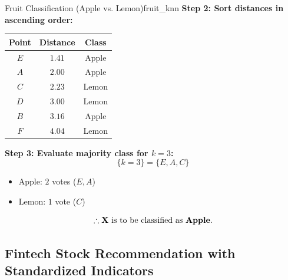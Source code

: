 \begin{example}{Fruit Classification (Apple vs. Lemon)}{fruit_knn}
\noindent\textbf{Step 2: Sort distances in ascending order:}
\begin{center}
\begin{tabular}{ccc}
\toprule
\textbf{Point} & \textbf{Distance} & \textbf{Class} \\
\midrule
$E$ & $1.41$ & Apple \\
$A$ & $2.00$ & Apple \\
$C$ & $2.23$ & Lemon \\
$D$ & $3.00$ & Lemon \\
$B$ & $3.16$ & Apple \\
$F$ & $4.04$ & Lemon \\
\bottomrule
\end{tabular}
\end{center}

\noindent\textbf{Step 3: Evaluate majority class for $k = 3$:}
$$\{k = 3\} = \{E, A, C\}$$
\begin{itemize}[leftmargin=1.5em]
    \item Apple: $2$ votes ($E, A$)
    \item Lemon: $1$ vote ($C$)
\end{itemize}
$$\therefore \mathbf{X} \text{ is to be classified as } \textbf{Apple}.$$
\end{example}

\subsection{Fintech Stock Recommendation with Standardized Indicators}

